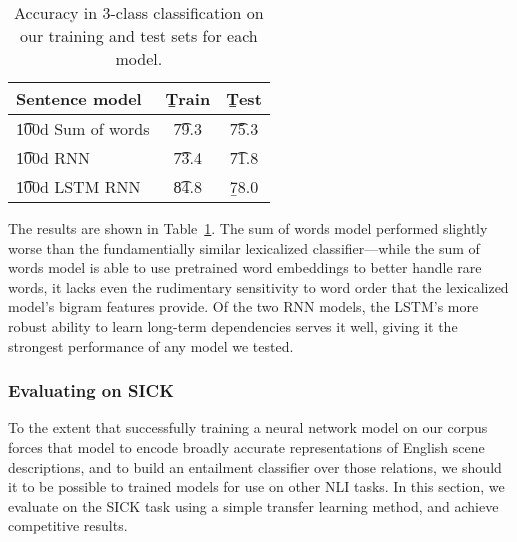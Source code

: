 \begin{table}
\begin{center}
\begin{tabular}{l@{\hskip \colspaceL}@{\hskip \colspaceL}c@{\hskip \colspaceL}c}
\hline
\textbf{Sentence model} & \b{Train}  & \b{Test}\\
\hline
\t{100d Sum of words}            & \t{79.3} & \t{75.3} \\

\t{100d RNN}            & \t{73.4} & \t{71.8} \\	

\t{100d LSTM RNN}            & \t{84.8} & \b{78.0} \\

\hline
\end{tabular}
\end{center}
\caption{
\label{tab:nnresults}
Accuracy in 3-class classification on our training and test sets for each model.
}
\end{table}

The results are shown in Table~\ref{tab:nnresults}. The sum of words model performed slightly worse than the fundamentially similar lexicalized classifier---while the sum of words model is able to use pretrained word embeddings to better handle rare words, it lacks even the rudimentary sensitivity to word order that the lexicalized model's bigram features provide. Of the two RNN models, the LSTM's more robust ability to learn long-term dependencies serves it well, giving it the strongest performance of any model we tested.

\subsubsection{Evaluating on SICK}

To the extent that successfully training a neural network model on our corpus forces that model to encode broadly accurate representations of English scene descriptions, and to build an entailment classifier over those relations, we should it to be possible to trained models for use on other NLI tasks. In this section, we evaluate on the SICK task using a simple transfer learning method, and achieve competitive results.

